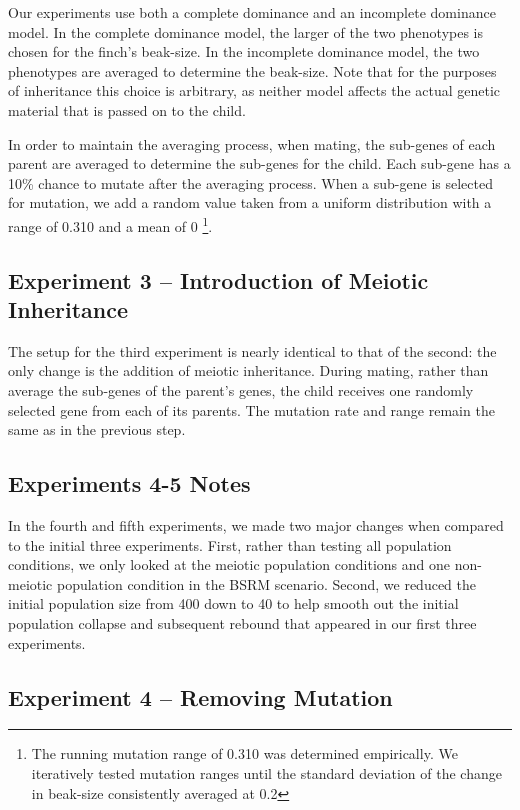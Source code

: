 \documentclass{article}
\begin{document}
Our experiments use both a complete dominance and an incomplete dominance model. In the complete dominance model, the larger of the two phenotypes is chosen for the finch's beak-size. In the incomplete dominance model, the two phenotypes are averaged to determine the beak-size. Note that for the purposes of inheritance this choice is arbitrary, as neither model affects the actual genetic material that is passed on to the child. 

In order to maintain the averaging process, when mating, the sub-genes of each parent are averaged to determine the sub-genes for the child. Each sub-gene has a 10\% chance to mutate after the averaging process. When a sub-gene is selected for mutation, we add a random value taken from a uniform distribution with a range of 0.310 and a mean of 0 \footnote{The running mutation range of 0.310 was determined empirically. We iteratively tested mutation ranges until the standard deviation of the change in beak-size consistently averaged at 0.2}.


	
\subsection{Experiment 3 -- Introduction of Meiotic
Inheritance}

The setup for the third experiment is nearly identical to that of the second: the only change is the addition of meiotic inheritance. During mating, rather than average the sub-genes of the parent's genes, the child receives one randomly selected gene from each of its parents. The mutation rate and range remain the same as in the previous step. 



\subsection{Experiments 4-5 Notes}

In the fourth and fifth experiments, we made two major changes when compared to the initial three experiments. First, rather than testing all population conditions, we only looked at the meiotic population conditions and one non-meiotic population condition in the BSRM scenario. Second, we reduced the initial population size from 400 down to 40 to help smooth out the initial population collapse and subsequent rebound that appeared in our first three experiments.

\subsection{Experiment 4 -- Removing Mutation}
\end{document}
